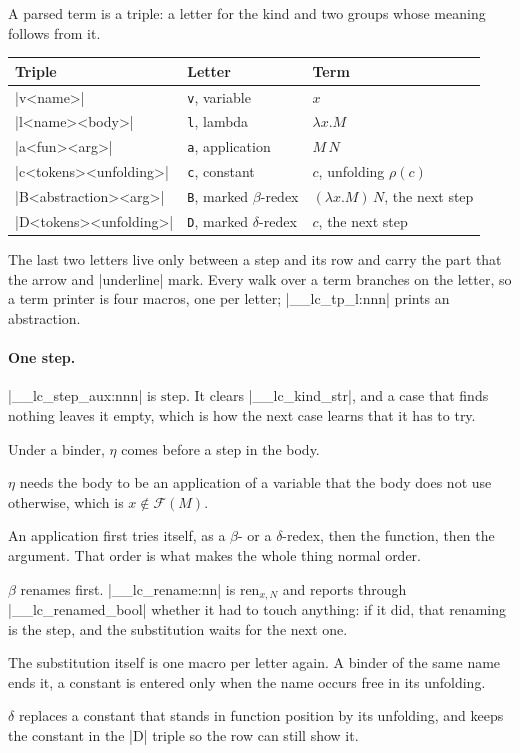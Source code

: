 \documentclass[parskip=half,english,numbers=noenddot,footnotes=nomultiple,oneside]{scrartcl}
\newcommand\lcsource[1]{\needspace{6\baselineskip}%
   }
\begin{document}
A parsed term is a triple: a letter for the kind and two groups whose meaning follows from it.
\begin{center}
\small
\begin{tabular}{@{}lll@{}}
   \toprule
   \textbf{Triple} & \textbf{Letter} & \textbf{Term} \\
   \midrule
   |{v}{<name>}{}| & \texttt{v}, variable & \(x\) \\
   |{l}{<name>}{<body>}| & \texttt{l}, lambda & \(\lambda x.M\) \\
   |{a}{<fun>}{<arg>}| & \texttt{a}, application & \(M\,N\) \\
   |{c}{<tokens>}{<unfolding>}| & \texttt{c}, constant & \(c\), unfolding \(\rho(c)\) \\
   \midrule
   |{B}{<abstraction>}{<arg>}| & \texttt{B}, marked \(\beta\)-redex & \((\lambda x.M)\,N\), the next step \\
   |{D}{<tokens>}{<unfolding>}| & \texttt{D}, marked \(\delta\)-redex & \(c\), the next step \\
   \bottomrule
\end{tabular}
\end{center}
The last two letters live only between a step and its row and carry the part that the arrow and |underline| mark. Every walk over a term branches on the letter, so a term printer is four macros, one per letter; |\__lc_tp_l:nnn| prints an abstraction.

\paragraph{One step.} |\__lc_step_aux:nnn| is \(\mathrm{step}\). It clears |\g__lc_kind_str|, and a case that finds nothing leaves it empty, which is how the next case learns that it has to try.
\lcsource{step}
Under a binder, \(\eta\) comes before a step in the body.
\lcsource{lambda}
\(\eta\) needs the body to be an application of a variable that the body does not use otherwise, which is \(x \notin \mathcal{F}(M)\).
\lcsource{eta}
An application first tries itself, as a \(\beta\)- or a \(\delta\)-redex, then the function, then the argument. That order is what makes the whole thing normal order.
\lcsource{application}
\(\beta\) renames first. |\__lc_rename:nn| is \(\mathrm{ren}_{x,N}\) and reports through |\g__lc_renamed_bool| whether it had to touch anything: if it did, that renaming is the step, and the substitution waits for the next one.
\lcsource{beta}
The substitution itself is one macro per letter again. A binder of the same name ends it, a constant is entered only when the name occurs free in its unfolding.
\lcsource{subst}
\(\delta\) replaces a constant that stands in function position by its unfolding, and keeps the constant in the |{D}| triple so the row can still show it.
\lcsource{delta}
\end{document}
